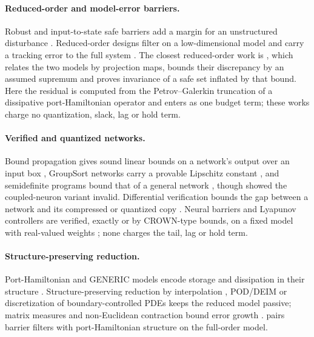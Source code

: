 \paragraph{Reduced-order and model-error barriers.}
Robust and input-to-state safe barriers add a margin for an unstructured disturbance \citep{jankovic2018robust,kolathaya2019issf}. Reduced-order designs filter on a low-dimensional model and carry a tracking error to the full system \citep{singletary2022kinematic,molnar2022modelfree,cohen2024romsurvey}. The closest reduced-order work is \citet{cohen2025romsynthesis}, which relates the two models by projection maps, bounds their discrepancy by an assumed supremum and proves invariance of a safe set inflated by that bound. Here the residual is computed from the Petrov--Galerkin truncation of a dissipative port-Hamiltonian operator and enters as one budget term; these works charge no quantization, slack, lag or hold term.

\paragraph{Verified and quantized networks.}
Bound propagation gives sound linear bounds on a network's output over an input box \citep{zhang2018crown,xu2020autolirpa,wang2021betacrown}, GroupSort networks carry a provable Lipschitz constant \citep{anil2019groupsort}, and semidefinite programs bound that of a general network \citep{fazlyab2019lipschitz}, though \citet{pauli2022lipschitz} showed the coupled-neuron variant invalid. Differential verification bounds the gap between a network and its compressed or quantized copy \citep{paulsen2020reludiff,zhang2023qebverif}. Neural barriers and Lyapunov controllers are verified, exactly or by CROWN-type bounds, on a fixed model with real-valued weights \citep{zhang2023exactncbf,yang2024lyapunov,dawson2023certificates}; none charges the tail, lag or hold term.

\paragraph{Structure-preserving reduction.}
Port-Hamiltonian and GENERIC models encode storage and dissipation in their structure \citep{vanderschaft2014overview,grmela1997generic}. Structure-preserving reduction by interpolation \citep{gugercin2012phmor}, POD/DEIM \citep{chaturantabut2016nonlinearph} or discretization of boundary-controlled PDEs \citep{toledozucco2024pfem} keeps the reduced model passive; matrix measures and non-Euclidean contraction bound error growth \citep{soderlind2006logarithmic,davydov2022contraction}. \citet{califano2023passivity} pairs barrier filters with port-Hamiltonian structure on the full-order model.

